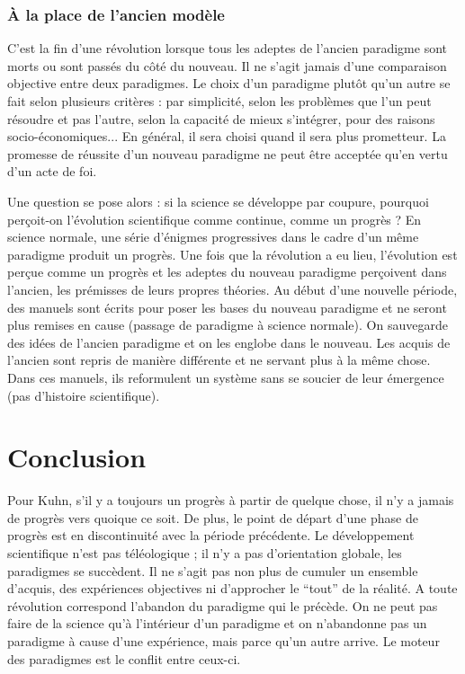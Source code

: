 \subsubsection{À la place de l'ancien modèle}
C'est la fin d'une révolution lorsque tous les adeptes de l'ancien paradigme sont morts ou sont passés du côté du nouveau.
Il ne s'agit jamais d'une comparaison objective entre deux paradigmes.
Le choix d'un paradigme plutôt qu'un autre se fait selon plusieurs critères : par simplicité, selon les problèmes que l'un peut résoudre et pas l'autre, selon la capacité de mieux s'intégrer, pour des raisons socio-économiques...
En général, il sera choisi  quand il sera plus prometteur.
La promesse de réussite d'un nouveau paradigme ne peut être acceptée qu'en vertu d'un acte de foi.

Une question se pose alors : si la science se développe par coupure, pourquoi perçoit-on l'évolution scientifique comme continue, comme un progrès ?  En science normale, une série d'énigmes progressives dans le cadre d'un même paradigme produit un progrès.
Une fois que la révolution a eu lieu, l'évolution est perçue comme un progrès et les adeptes du nouveau paradigme perçoivent dans l'ancien, les prémisses de leurs propres théories.
Au début d'une nouvelle période, des manuels sont écrits pour poser les bases du nouveau paradigme et ne seront plus remises en cause (passage de paradigme à science normale).
On sauvegarde des idées de l'ancien paradigme et on les englobe dans le nouveau.
Les acquis de l'ancien sont repris de manière différente et ne servant plus à la même chose.
Dans ces manuels, ils reformulent un système sans se soucier de leur émergence (pas d'histoire scientifique).

\section{Conclusion}
Pour Kuhn, s'il y a toujours un progrès à partir de quelque chose, il n'y a jamais de progrès vers quoique ce soit.
De plus, le point de départ d'une phase de progrès est en discontinuité avec la période précédente.
Le développement scientifique n'est pas téléologique ; il n'y a pas d'orientation globale, les paradigmes se succèdent.
Il ne s'agit pas non plus de cumuler un ensemble d'acquis, des expériences objectives ni d'approcher le ``tout'' de la réalité.
A toute révolution correspond l'abandon du paradigme qui le précède.
On ne peut pas faire de la science qu'à l'intérieur d'un paradigme et on n'abandonne pas un paradigme à cause d'une expérience, mais parce qu'un autre arrive.
Le moteur des paradigmes est le conflit entre ceux-ci.

